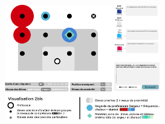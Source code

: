 \documentclass{article}
\begin{document}
\begin{itemize}
    \begin{center}
      \includegraphics[height=5cm]{visu_dessus.png}
    \end{center}
\end{itemize}

{}

\end{document}
